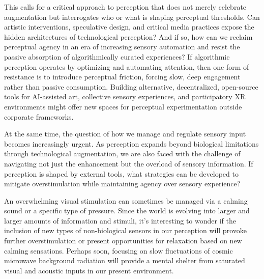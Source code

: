 This calls for a critical approach to perception that does not merely celebrate augmentation but interrogates who or what is shaping perceptual thresholds. Can artistic interventions, speculative design, and critical media practices expose the hidden architectures of technological perception? And if so, how can we reclaim perceptual agency in an era of increasing sensory automation and resist the passive absorption of algorithmically curated experiences? If algorithmic perception operates by optimizing and automating attention, then one form of resistance is to introduce perceptual friction, forcing slow, deep engagement rather than passive consumption. Building alternative, decentralized, open-source tools for AI-assisted art, collective sensory experiences, and participatory XR environments might offer new spaces for perceptual experimentation outside corporate frameworks.

At the same time, the question of how we manage and regulate sensory input becomes increasingly urgent. As perception expands beyond biological limitations through technological augmentation, we are also faced with the challenge of navigating not just the enhancement but the overload of sensory information. If perception is shaped by external tools, what strategies can be developed to mitigate overstimulation while maintaining agency over sensory experience?

An overwhelming visual stimulation can sometimes be managed via a calming sound or a specific type of pressure. Since the world is evolving into larger and larger amounts of information and stimuli, it's interesting to wonder if the inclusion of new types of non-biological sensors in our perception will provoke further overstimulation or present opportunities for relaxation based on new calming sensations. Perhaps soon, focusing on slow fluctuations of cosmic microwave background radiation will provide a mental shelter from saturated visual and acoustic inputs in our present environment.



